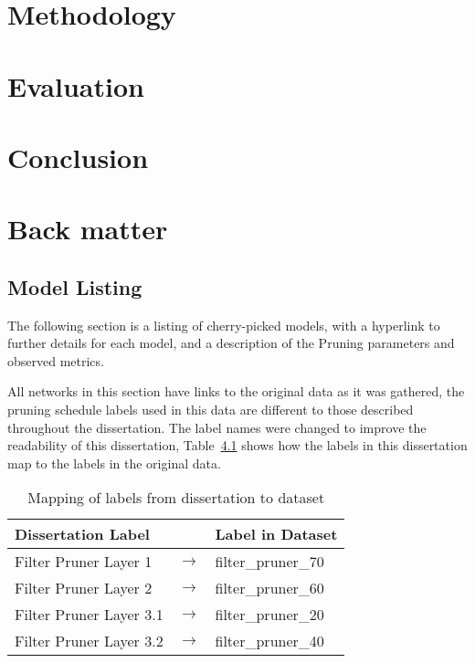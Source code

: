 \documentclass[11pt]{report}
\begin{document}
\newpage



\chapter{Methodology}



\chapter{Evaluation}


\chapter{Conclusion}


\newpage
\appendix
\chapter{Back matter}
\section{Model Listing}
The following section is a listing of cherry-picked models, with a hyperlink to further details for each model, and a description of the Pruning parameters and observed metrics.

All networks in this section have links to the original data as it was gathered, the pruning schedule labels used in this data are different to those described throughout the dissertation. 
The label names were changed to improve the readability of this dissertation, Table~\ref{tab:labelMapping} shows how the labels in this dissertation map to the labels in the original data. 


\begin{table}[H]
    \centering
    \begin{tabular}{@{}lll@{}}
    \toprule
    \textbf{Dissertation Label} &                & \textbf{Label in Dataset} \\ \hline
    Filter Pruner Layer 1       & $\rightarrow$ & filter\_pruner\_70        \\
    Filter Pruner Layer 2       & $\rightarrow$ & filter\_pruner\_60        \\
    Filter Pruner Layer 3.1     & $\rightarrow$ & filter\_pruner\_20        \\
    Filter Pruner Layer 3.2     & $\rightarrow$ & filter\_pruner\_40        \\ \hline
    \end{tabular}
    \caption{Mapping of labels from dissertation to dataset}
    \label{tab:labelMapping}
\end{table}
\end{document}
